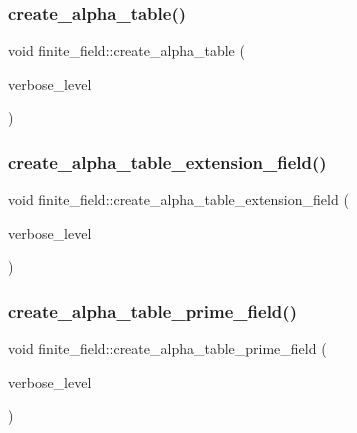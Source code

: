 \subsubsection{\texorpdfstring{create\+\_\+alpha\+\_\+table()}{create\_alpha\_table()}}
{\footnotesize\ttfamily void finite\+\_\+field\+::create\+\_\+alpha\+\_\+table (\begin{DoxyParamCaption}\item[{\mbox{\hyperlink{galois_8h_a09fddde158a3a20bd2dcadb609de11dc}{I\+NT}}}]{verbose\+\_\+level }\end{DoxyParamCaption})}

\mbox{\label{classfinite__field_ac7dea38ff2bb99e41863832e4a468947}} 
\subsubsection{\texorpdfstring{create\+\_\+alpha\+\_\+table\+\_\+extension\+\_\+field()}{create\_alpha\_table\_extension\_field()}}
{\footnotesize\ttfamily void finite\+\_\+field\+::create\+\_\+alpha\+\_\+table\+\_\+extension\+\_\+field (\begin{DoxyParamCaption}\item[{\mbox{\hyperlink{galois_8h_a09fddde158a3a20bd2dcadb609de11dc}{I\+NT}}}]{verbose\+\_\+level }\end{DoxyParamCaption})}

\mbox{\label{classfinite__field_a467585ef59e1cbd89735e517457fbedc}} 
\subsubsection{\texorpdfstring{create\+\_\+alpha\+\_\+table\+\_\+prime\+\_\+field()}{create\_alpha\_table\_prime\_field()}}
{\footnotesize\ttfamily void finite\+\_\+field\+::create\+\_\+alpha\+\_\+table\+\_\+prime\+\_\+field (\begin{DoxyParamCaption}\item[{\mbox{\hyperlink{galois_8h_a09fddde158a3a20bd2dcadb609de11dc}{I\+NT}}}]{verbose\+\_\+level }\end{DoxyParamCaption})}

